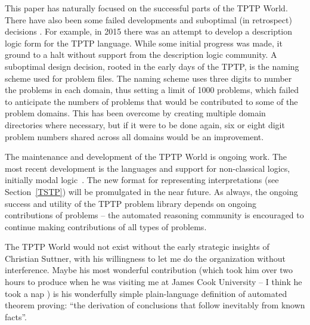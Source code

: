 \documentclass[runningheads]{llncs}
\begin{document}
This paper has naturally focused on the successful parts of the TPTP World.
There have also been some failed developments and suboptimal (in retrospect) decisions \frownie{}.
For example, in 2015 there was an attempt to develop a description logic form for the TPTP 
language. 
While some initial progress was made, it ground to a halt without support from the description 
logic community.
A suboptimal design decision, rooted in the early days of the TPTP, is the naming scheme used for 
problem files. 
The naming scheme uses three digits to number the problems in each domain, thus setting a limit 
of 1000 problems, which failed to anticipate the numbers of problems that would be contributed 
to some of the problem domains.
This has been overcome by creating multiple domain directories where necessary, but if it were 
to be done again, six or eight digit problem numbers shared across all domains would be an 
improvement.

The maintenance and development of the TPTP World is ongoing work.
The most recent development is the languages and support for non-classical logics, initially
modal logic~\cite{SF+22,SS24}.
The new format for representing interpretations (see Section~\ref{TSTP}) will be promulgated in 
the near future.
As always, the ongoing success and utility of the TPTP problem library depends on ongoing 
contributions of problems -- the automated reasoning community is encouraged to continue making 
contributions of all types of problems.

The TPTP World would not exist without the early strategic insights of Christian Suttner,
with his willingness to let me do the organization without interference. 
Maybe his most wonderful contribution (which took him over two hours to produce when he
was visiting me at James Cook University -- I think he took a nap \smiley) is his 
wonderfully simple plain-language definition of automated theorem proving: 
``the derivation of conclusions that follow inevitably from known facts''.



\end{document}
